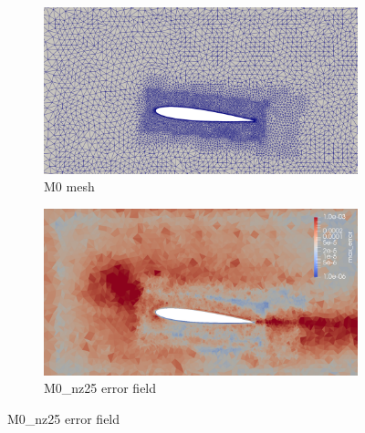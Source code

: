 \begin{figure}[H]
	\centering
	
	\begin{subfigure}[b]{0.475\textwidth}
		\centering
		\includegraphics[width=1\textwidth]{figures/zonal_adapt_results/Mesh_and_error_plots_Re200k/M0_inplane.png}
		\caption{M0 mesh}
		\label{fig:zonal_M0_mesh_Re200k}
	\end{subfigure}
	\begin{subfigure}[b]{0.475\textwidth}
		\centering
		\includegraphics[width=1\textwidth]{figures/zonal_adapt_results/Mesh_and_error_plots_Re200k/M0_error.png}
		\caption{M0\_nz25 error field}
		\label{fig:zonal_M0_error_Re200k}
	\end{subfigure}
	

\end{figure}
